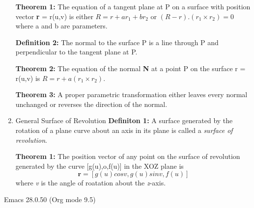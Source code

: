 \documentclass[11pt]{article}
\begin{document}
\begin{enumerate}
\textbf{Theorem 1:} The equation of a tangent plane at P on a surface with position vector \textbf{r} = r(u,v) is either \(R = r+ar_{1}+br_{2}\) or \((R-r).(r_{1}\times r_{2}) = 0\) where a and b are parameters.

\textbf{Definition 2:} The normal to the surface P is a line through P and perpendicular to the tangent plane at P.

\textbf{Theorem 2:} The equation of the normal \textbf{N} at a point P on the surface r = r(u,v) is \(R=r+a(r_{1}\times r_{2})\).

\textbf{Theorem 3:} A proper parametric transformation either leaves every normal unchanged or reverses the direction of the normal.
\item General Surface of Revolution
\label{sec:org6785d2f}
\textbf{Definiton 1:} A surface generated by the rotation of a plane curve about an axis in its plane is called a \emph{surface of revolution}.

\textbf{Theorem 1:} The position vector of any point on the surface of revolution generated by the curve [g(u),o,f(u)] in the XOZ plane is
\[
\textbf{r} = [g(u)cosv, g(u)sinv, f(u)]
\]
where \emph{v} is the angle of roatation about the \emph{z}-axis.
\end{enumerate}
Emacs 28.0.50 (Org mode 9.5)
\end{document}
